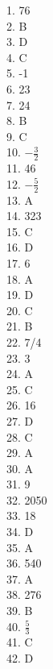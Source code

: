 \documentclass[../satmath.tex]{subfiles}
\begin{document}
1. 76\\
2. B\\
3. D\\
4. C\\
5. -1\\
6. 23\\
7. 24\\
8. B\\
9. C\\
10. $-\frac{3}{2}$\\
11. 46\\
12. $-\frac{5}{2}$\\
13. A\\
14. 323\\
15. C\\
16. D\\
17. 6\\
18. A\\
19. D\\
20. C\\
21. B\\
22. 7/4\\
23. 3\\
24. A\\
25. C\\
26. 16\\
27. D\\
28. C\\
29. A\\
30. A\\
31. 9\\
32. 2050\\
33. 18\\
34. D\\
35. A\\
36. 540\\
37. A\\
38. 276\\
39. B\\
40. $\frac{5}{3}$\\
41. C\\
42. D
\end{document}
